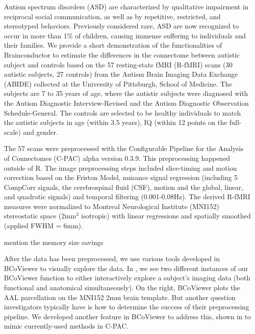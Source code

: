 \documentclass{nature}
\begin{document}
Autism spectrum disorders (ASD) are characterized by qualitative impairment in reciprocal social communication, as well as by repetitive, restricted, and stereotyped behaviors. Previously considered rare, ASD are now recognized to occur in more than 1\% of children, causing immense suffering to individuals and their families. 
We provide a short demonstration of the functionalities of Brainconductor to
estimate the differences in the connectome between autistic subject and controls based
on the 57 resting-state fMRI (R-fMRI) scans (30 autistic subjects, 27 controls) from the Autism
Brain Imaging Data Exchange (ABIDE) collected at the 
University of Pittsburgh, School of Medicine\cite{di2014autism}. 
The subjects are 7 to 35 years of age, where the autistic subjects were
diagnosed with the Autism Diagnostic Interview-Revised and the Autism Diagnostic 
Observation Schedule-General. The controls are selected to be healthy
individuals to match the autistic subjects in age (within 3.5 years), IQ (within
12 points on the full-scale) and gender.

The 57 scans were preprocessed with the Configurable Pipeline for the Analysis
of Connectomes (C-PAC) alpha version 0.3.9. This preprocessing 
happened outside of R. The image preprocessing steps
included slice-timing and motion correction based on the Friston Model, nuisance signal
regression (including 5 CompCorr signals, the cerebrospinal fluid (CSF), motion
 and the global, linear, and quadratic
signals) and temporal filtering (0.001-0.08Hz). The derived R-fMRI measures
were normalized to Montreal Neurological Institute (MNI152) stereostatic
space (2mm$^3$ isotropic) with linear regressions and spatially smoothed
(applied FWHM = 6mm). 

{\color{red}mention the memory size savings}

After the data has been preprocessed, we use various tools developed in BCoViewer
to visually explore the data. In , we see two different instances
of our BCoViewer function to either interactively explore a subject's imaging data (both
functional and anatomical simultaneously). On the right, BCoViewer plots the AAL parcellation
on the MNI152 2mm brain template. But another question investigators typically have is 
how to determine the success of their preprocessing pipeline. We developed another feature
in BCoViewer to address this, shown in  to mimic currently-used methods
in C-PAC.
\end{document}
